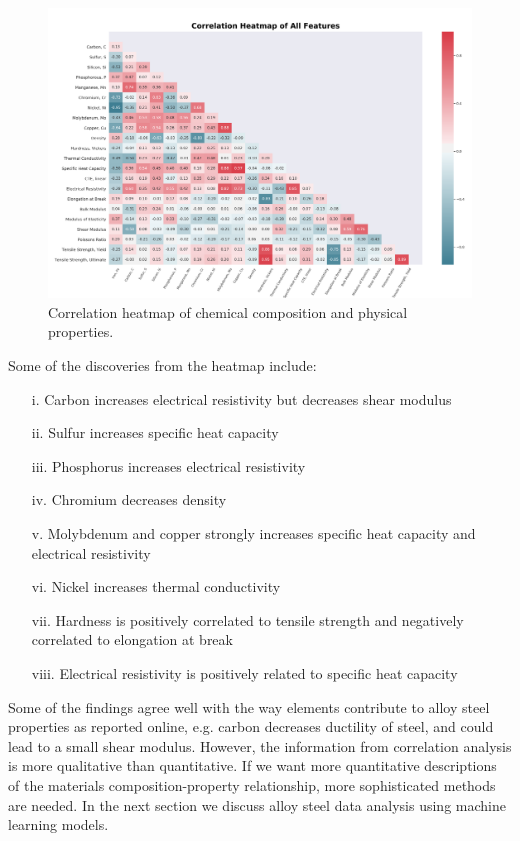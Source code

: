 \documentclass[10pt,aps,prb,amsmath,amssymb,twocolumn,letterpaper,nobalancelastpage,final,citeautoscript,floatfix,raggedbottom,superscriptaddress]{revtex4-1}
\begin{document}
\begin{figure}[t]
  \center
 \includegraphics[width=0.85\linewidth]{figures/heatmap_mask.png}
  \caption{Correlation heatmap of chemical composition and physical properties.}
  \label{fig:heatmap}
\end{figure}

Some of the discoveries from the heatmap include:
\begin{enumerate}
	\item[i.] Carbon increases electrical resistivity but decreases shear modulus
	\item[ii.] Sulfur increases specific heat capacity
	\item[iii.] Phosphorus increases electrical resistivity
	\item[iv.] Chromium decreases density
	\item[v.] Molybdenum and copper strongly increases specific heat capacity and electrical resistivity
	\item[vi.] Nickel increases thermal conductivity
	\item[vii.] Hardness is positively correlated to tensile strength and negatively correlated to elongation at break
	\item[viii.] Electrical resistivity is positively related to specific heat capacity
\end{enumerate}


Some of the findings agree well with the way elements contribute to alloy steel properties as reported online, e.g. carbon decreases ductility of steel, and could lead to a small shear modulus. However, the information from correlation analysis is more qualitative than quantitative. If we want more quantitative descriptions of the materials composition-property relationship, more sophisticated methods are needed. In the next section we discuss alloy steel data analysis using machine learning models.
\end{document}
